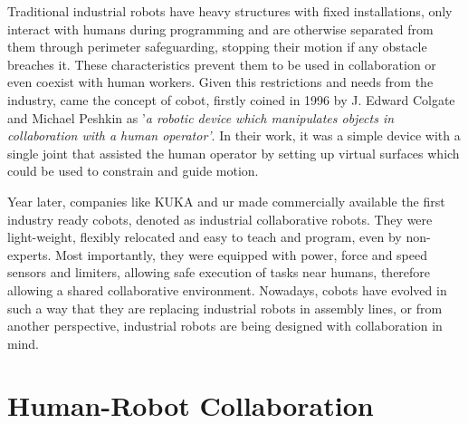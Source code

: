 \par Traditional industrial robots have heavy structures with fixed installations, only interact with humans during programming and are otherwise separated from them through perimeter safeguarding, stopping their motion if any obstacle breaches it. These characteristics prevent them to be used in collaboration or even coexist with human workers. Given this restrictions and needs from the industry, came the concept of \ac{cobot}, firstly coined in 1996 by J. Edward Colgate and Michael Peshkin \cite{cobot.old} as '\textit{a robotic device which manipulates objects in collaboration with a human operator'}. In their work, it was a simple device with a single joint that assisted the human operator by setting up virtual surfaces which could be used to constrain and guide motion.

\par Year later, companies like KUKA and \ac{ur} made commercially available the first industry ready cobots, denoted as industrial collaborative robots. They were light-weight, flexibly relocated and easy to teach and program, even by non-experts. Most importantly, they were equipped with power, force and speed sensors and limiters, allowing safe execution of tasks near humans, therefore allowing a shared collaborative environment. 
% 
Nowadays, cobots have evolved in such a way that they are replacing industrial robots in assembly lines, or from another perspective, industrial robots are being designed with collaboration in mind.




\section{Human-Robot Collaboration}


